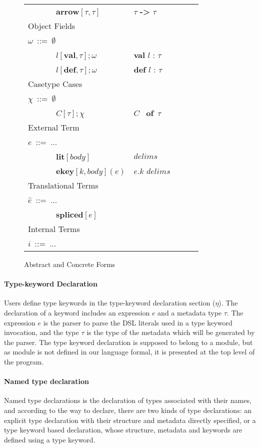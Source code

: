 \documentclass{sig-alternate}
\makeatletter
\newcommand\BeraMonottfamily{%
  \def\fvm@Scale{0.85}%
  \fontfamily{fvm}\selectfont%
}
\newcommand{\textcd}[1]{\textbf{\scriptsize\BeraMonottfamily{#1}}}
\newcommand{\mycaption}[1]{\vspace{-4px}\caption{#1}\vspace{-2px}}
\newcommand{\tabularspace}{~~~~~~~}
\makeatother
\begin{document}
\begin{figure}[ht]
\begin{tabular}{ l l l l l }
\tabularspace$\mathbf{arrow}[\tau, \tau]$     & $\tau$ \textcd{->} $\tau$\\
\multicolumn{3}{l}{Object Fields}\\       
$\omega$~::=~$\emptyset$                      \\
\tabularspace$l[\mathbf{val},\tau];\omega$                 & \textcd{val} $l$ : $\tau$\\
\tabularspace$l[\mathbf{def},\tau];\omega$                 & \textcd{def} $l$ : $\tau$\\
\multicolumn{3}{l}{Casetype Cases}\\
$\chi$~::=~$\emptyset$                      \\                 
\tabularspace$C[\tau];\chi$                   & $C$~\textcd{of}~$\tau$\\
\multicolumn{3}{l}{External Term}\\
 $e$~::=~...                              & \\
\tabularspace$\mathbf{lit}[body]$             & $delims$\\
\tabularspace$\mathbf{ekey}[k,body](e)$       & $e.k$ $delims$\\
\multicolumn{3}{l}{Translational Terms}\\
$\hat{e}$~::=~...                              & \\
\tabularspace$\mathbf{spliced}[e]$            & \\
\multicolumn{3}{l}{Internal Terms}\\
$i$~::=~...                                                     
\end{tabular}
\mycaption{Abstract and Concrete Forms}
\label{formal-syntax}
\end{figure}


\paragraph{Type-keyword Declaration}
Users define type keywords in the type-keyword declaration section ($\eta$). The declaration of a keyword includes an expression $e$ and a metadata type $\tau$. The expression $e$ is the parser to parse the DSL literals used in a type keyword invocation, and the type $\tau$ is the type of the metadata which will be generated by the parser. The type keyword declaration is supposed to belong to a module, but as module is not defined in our language formal, it is presented at the top level of the program.

\paragraph{Named type declaration}
Named type declarations is the declaration of types associated with their names, and according to the way to declare, there are two kinds of type declarations: an explicit type declaration with their structure and metadata directly specified, or a type keyword based declaration, whose structure, metadata and keywords are defined using a type keyword.
\end{document}
